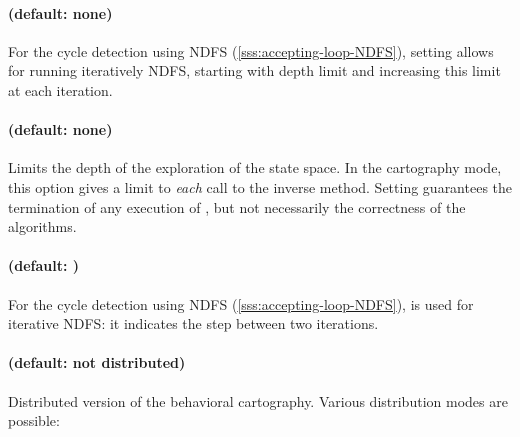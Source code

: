 \paragraph{ (default: none)}
For the cycle detection using NDFS (\cref{sss:accepting-loop-NDFS}),
setting  allows for running iteratively NDFS,
starting with depth limit  and increasing this limit
at each iteration.

\paragraph{ (default: none)}
Limits the depth of the exploration of the state space.
In the cartography mode, this option gives a limit to \emph{each} call to the inverse method.
Setting  guarantees the termination of any execution of \imitator{}, but not necessarily the correctness of the algorithms.


\paragraph{ (default: )}
For the cycle detection using NDFS (\cref{sss:accepting-loop-NDFS}),
 is used for iterative NDFS: it indicates the step between two iterations.


\paragraph{ (default: not distributed)}
Distributed version of the behavioral cartography.
Various distribution modes are possible:

